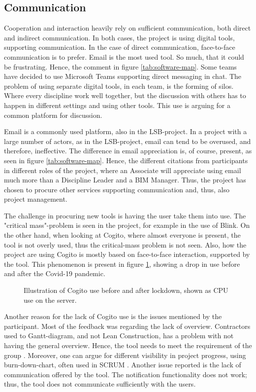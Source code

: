 \subsection{Communication}
Cooperation and interaction heavily rely on sufficient communication, both direct and indirect communication. In both cases, the project is using digital tools, supporting communication. In the case of direct communication, face-to-face communication is to prefer. Email is the most used tool. So much, that it could be frustrating. Hence, the comment in figure \ref{tab:software-map}. Some teams have decided to use Microsoft Teams supporting direct messaging in chat. The problem of using separate digital tools, in each team, is the forming of silos. Where every discipline work well together, but the discussion with others has to happen in different settings and using other tools. This use is arguing for a common platform for discussion. 

Email is a commonly used platform, also in the LSB-project. In a project with a large number of actors, as in the LSB-project, email can tend to be overused, and therefore, ineffective. The difference in email appreciation is, of course, present, as seen in figure \ref{tab:software-map}. Hence, the different citations from participants in different roles of the project, where an Associate will appreciate using email much more than a Discipline Leader and a BIM Manager. Thus, the project has chosen to procure other services supporting communication and, thus, also project management.

The challenge in procuring new tools is having the user take them into use. The "critical mass"-problem \cite{markus1987toward} is seen in the project, for example in the use of Blink. On the other hand, when looking at Cogito, where almost everyone is present, the tool is not overly used, thus the critical-mass problem is not seen. Also, how the project are using Cogito is mostly based on face-to-face interaction, supported by the tool. This phenomenon is present in figure \ref{fig:cogito_use}, showing a drop in use before and after the Covid-19 pandemic. 

\begin{figure}
    \centering

    \caption{Illustration of Cogito use before and after lockdown, shown as CPU use on the server.}
    \label{fig:cogito_use}
\end{figure}

Another reason for the lack of Cogito use is the issues mentioned by the participant. Most of the feedback was regarding the lack of overview. Contractors used to Gantt-diagram, and not Lean Construction, has a problem with not having the general overview. Hence, the tool needs to meet the requirement of the group \cite{subramanyam2010user}. Moreover, one can argue for different visibility in project progress, using burn-down-chart, often used in SCRUM \cite{sutherland}. Another issue reported is the lack of communication offered by the tool. The notification functionality does not work; thus, the tool does not communicate sufficiently with the users. 

